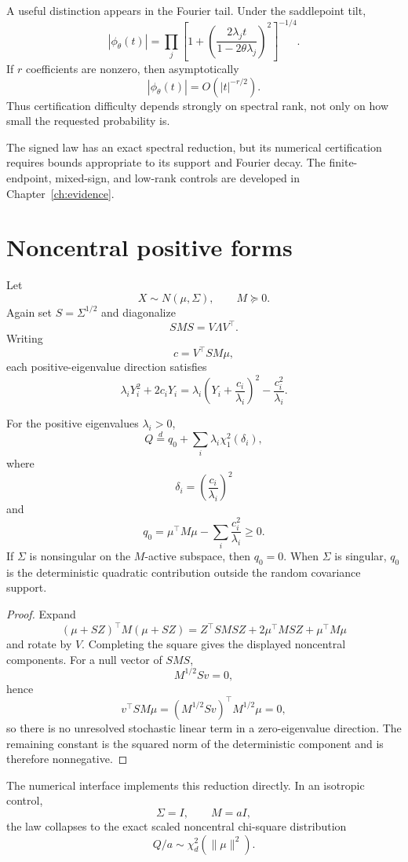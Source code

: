 A useful distinction appears in the Fourier tail.  Under the saddlepoint tilt,
\[
\left|\phi_\theta(t)\right|
=
\prod_j
\left[
1+
\left(
\frac{2\lambda_j t}{1-2\theta\lambda_j}
\right)^2
\right]^{-1/4}.
\]
If $r$ coefficients are nonzero, then asymptotically
\[
|\phi_\theta(t)|=O(|t|^{-r/2}).
\]
Thus certification difficulty depends strongly on spectral rank, not only on
how small the requested probability is.

The signed law has an exact spectral reduction, but its numerical
certification requires bounds appropriate to its support and Fourier decay.
The finite-endpoint, mixed-sign, and low-rank controls are developed in
Chapter~\ref{ch:evidence}.

\section{Noncentral positive forms}

Let
\[
X\sim N(\mu,\Sigma),
\qquad
M\succeq0.
\]
Again set \(S=\Sigma^{1/2}\) and diagonalize
\[
SMS=V\Lambda V^\top.
\]
Writing
\[
c=V^\top SM\mu,
\]
each positive-eigenvalue direction satisfies
\[
\lambda_iY_i^2+2c_iY_i
=
\lambda_i
\left(
Y_i+\frac{c_i}{\lambda_i}
\right)^2
-
\frac{c_i^2}{\lambda_i}.
\]

\begin{theorem}\label{claim:final-2-3}
For the positive eigenvalues \(\lambda_i>0\),
\[
\boxed{
Q
\overset d=
q_0
+
\sum_i
\lambda_i
\chi^2_1(\delta_i),
}
\]
where
\[
\delta_i=
\left(\frac{c_i}{\lambda_i}\right)^2
\]
and
\[
q_0
=
\mu^\top M\mu
-
\sum_i\frac{c_i^2}{\lambda_i}
\ge0.
\]
If \(\Sigma\) is nonsingular on the \(M\)-active subspace, then \(q_0=0\).
When \(\Sigma\) is singular, \(q_0\) is the deterministic quadratic
contribution outside the random covariance support.
\end{theorem}

\begin{proof}
Expand
\[
(\mu+SZ)^\top M(\mu+SZ)
=
Z^\top SMSZ
+
2\mu^\top MSZ
+
\mu^\top M\mu
\]
and rotate by \(V\).  Completing the square gives the displayed
noncentral components.  For a null vector of \(SMS\),
\[
M^{1/2}Sv=0,
\]
hence
\[
v^\top SM\mu
=
(M^{1/2}Sv)^\top M^{1/2}\mu
=
0,
\]
so there is no unresolved stochastic linear term in a zero-eigenvalue
direction.  The remaining constant is the squared norm of the deterministic
component and is therefore nonnegative.
\end{proof}

The numerical interface implements this reduction directly.  In an isotropic
control,
\[
\Sigma=I,\qquad M=aI,
\]
the law collapses to the exact scaled noncentral chi-square distribution
\[
Q/a\sim\chi^2_d(\|\mu\|^2).
\]


